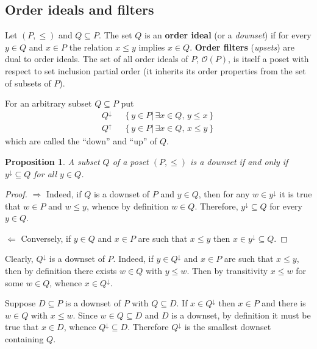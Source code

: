 \documentclass[a4paper]{article}
\newcommand{\obj}[1]{{\left\{ #1 \right \}}}
\newcommand{\induc}[1]{{\left . #1 \right \vert}}
\newcommand{\Ocal}{\mathcal{O}}
\newtheorem{prop}{Proposition}
\newcommand{\defn}{\mathop{\overset{\Delta}{=}}\nolimits}
\begin{document}
\subsection{Order ideals and filters} %
\label{sub:order_ideals_and_filters}

Let $(P,\leq)$ and $Q\subseteq P$. The set $Q$ is an \textbf{order ideal} (or a \emph{downset}) if for every $y\in Q$ and $x\in P$ the relation $x\leq y$ implies $x\in Q$. \textbf{Order filters} (\emph{upsets}) are dual to order ideals. The set of all order ideals of $P$, $\Ocal(P)$, is itself a poset with respect to set inclusion partial order (it inherits its order properties from the set of subsets of $P$).

For an arbitrary subset $Q\subseteq P$ put \begin{align*}
	Q^\downarrow &\defn \obj{ \induc{ y\in P }\,\exists x\in Q,\, y\leq x }\\
	Q^\uparrow &\defn \obj{ \induc{ y\in P }\,\exists x\in Q,\, x\leq y }
\end{align*}
which are called the ``down'' and ``up'' of $Q$.

\begin{prop} A subset $Q$ of a poset $(P,\leq)$ is a downset if and only if $y^\downarrow\subseteq Q$ for all $y\in Q$.
\end{prop}

\begin{proof}
$\Rightarrow$ Indeed, if $Q$ is a downset of $P$ and $y\in Q$, then for any $w\in y^\downarrow$ it is true that $w\in P$ and $w\leq y$, whence by definition $w\in Q$. Therefore, $y^\downarrow\subseteq Q$ for every $y\in Q$.

$\Leftarrow$ Conversely, if $y\in Q$ and $x\in P$ are such that $x\leq y$ then $x\in y^\downarrow\subseteq Q$.
\end{proof}

Clearly, $Q^\downarrow$ is a downset of $P$. Indeed, if $y\in Q^\downarrow$ and $x\in P$ are such that $x\leq y$, then by definition there exists $w\in Q$ with $y\leq w$. Then by transitivity $x\leq w$ for some $w\in Q$, whence $x\in Q^\downarrow$.

Suppose $D\subseteq P$ is a downset of $P$ with $Q\subseteq D$. If $x\in Q^\downarrow$ then $x\in P$ and there is $w\in Q$ with $x\leq w$. Since $w\in Q\subseteq D$ and $D$ is a downset, by definition it must be true that $x\in D$, whence $Q^\downarrow\subseteq D$. Therefore $Q^\downarrow$ is the smallest downset containing $Q$.
\end{document}
